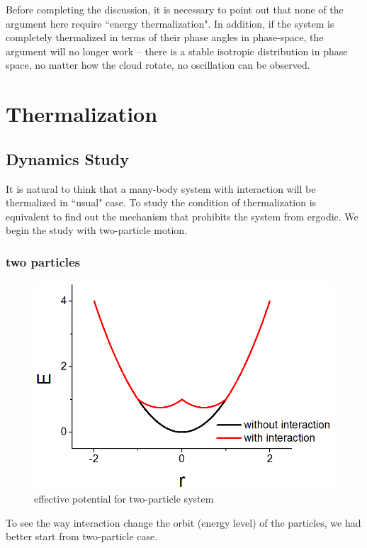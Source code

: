 \documentclass[aps,preprintnumbers,onecolumn,amsmath,amssymb,floatfix,pra]{revtex4-1}
\begin{document}
Before completing the discussion, it is necessary to point out that none of the argument here require ``energy thermalization". In addition, if the system is completely thermalized in terms of their phase angles in phase-space, the argument will no longer work -- there is a stable isotropic distribution in phase space, no matter how the cloud rotate, no oscillation can be observed.


\section{Thermalization}\label{section:Thermalization}
\subsection{Dynamics Study}
It is natural to think that a many-body system with interaction will be thermalized in ``usual" case. To study the condition of thermalization is equivalent to find out the mechanism that prohibits the system from ergodic. We begin the study with two-particle motion. 
\subsubsection{two particles}

\begin{figure}[h]
\centering
\includegraphics[scale=0.2]{ZhiyuPictures/effective_potential.png}
\caption{effective potential for two-particle system}
\label{fig:thermalization2}
\end{figure}

To see the way interaction change the orbit (energy level) of the particles, we had better start from two-particle case.
\end{document}
